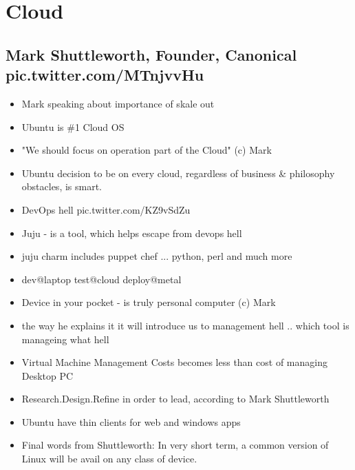 \documentclass[10pt]{article}
\begin{document}
{\section{Cloud}
\subsection{Mark Shuttleworth, Founder, Canonical pic.twitter.com/MTnjvvHu}
\begin{itemize}
\item Mark speaking about importance of skale out
\item Ubuntu is \#1 Cloud OS
\item "We should focus on operation part of the Cloud" (c) Mark
\item Ubuntu decision to be on every cloud, regardless of business \& philosophy obstacles, is smart. 
\item DevOps hell pic.twitter.com/KZ9vSdZu
\item Juju - is a tool, which helps escape from devops hell
\item juju charm includes puppet chef ... python, perl and much more
\item dev@laptop test@cloud deploy@metal
\item Device in your pocket - is truly personal computer (c) Mark
\item the way he explains it it will introduce us to management hell .. which tool is manageing what hell 
\item Virtual Machine Management Costs becomes less than cost of managing Desktop PC
\item Research.Design.Refine in order to lead, according to Mark Shuttleworth 
\item Ubuntu have thin clients for web and windows apps
\item Final words from Shuttleworth: In very short term, a common version of Linux will be avail on any class of device.
\end{itemize}

}
\end{document}
